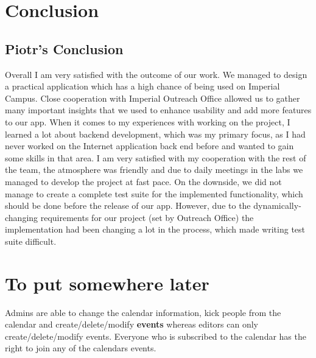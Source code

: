 \documentclass[10pt,a4paper]{article}
\begin{document}
\section{Conclusion}
 \subsection{Piotr's Conclusion}
 Overall I am very satisfied with the outcome of our work. We managed to design a practical application which has a high chance of being used on Imperial Campus. Close cooperation with Imperial Outreach Office allowed us to gather many important insights that we used to enhance usability and add more features to our app. When it comes to my experiences with working on the project, I learned a lot about backend development, which was my primary focus, as I had never worked on the Internet application back end before and wanted to gain some skills in that area. I am very satisfied with my cooperation with the rest of the team, the atmosphere was friendly and due to daily meetings in the labs we managed to develop the project at fast pace. On the downside, we did not manage to create a complete test suite for the implemented functionality, which should be done before the release of our app. However, due to the dynamically-changing requirements for our project (set by Outreach Office) the implementation had been changing a lot in the process, which made writing test suite difficult. 

\newpage
\newpage
\section{To put somewhere later}
Admins are able to change the calendar information, kick people from the calendar and create/delete/modify \textbf{events} whereas editors can only create/delete/modify events. Everyone who is subscribed to the calendar has the right to join any of the calendars events.
\end{document}
